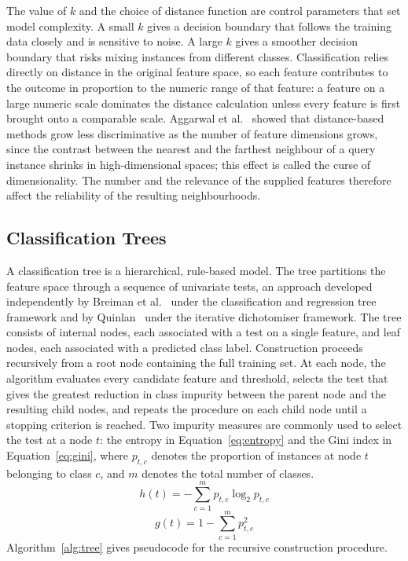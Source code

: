 \documentclass[10pt,conference]{IEEEtran}
\begin{document}
The value of $k$ and the choice of distance function are control parameters that set model complexity. A small $k$ gives a decision boundary that follows the training data closely and is sensitive to noise. A large $k$ gives a smoother decision boundary that risks mixing instances from different classes. Classification relies directly on distance in the original feature space, so each feature contributes to the outcome in proportion to the numeric range of that feature: a feature on a large numeric scale dominates the distance calculation unless every feature is first brought onto a comparable scale. Aggarwal et al.~\cite{aggarwal2001} showed that distance-based methods grow less discriminative as the number of feature dimensions grows, since the contrast between the nearest and the farthest neighbour of a query instance shrinks in high-dimensional spaces; this effect is called the curse of dimensionality. The number and the relevance of the supplied features therefore affect the reliability of the resulting neighbourhoods.

\subsection{Classification Trees}
\label{sec:background-tree}

A classification tree is a hierarchical, rule-based model. The tree partitions the feature space through a sequence of univariate tests, an approach developed independently by Breiman et al.~\cite{breiman1984} under the classification and regression tree framework and by Quinlan~\cite{quinlan1986} under the iterative dichotomiser framework. The tree consists of internal nodes, each associated with a test on a single feature, and leaf nodes, each associated with a predicted class label. Construction proceeds recursively from a root node containing the full training set. At each node, the algorithm evaluates every candidate feature and threshold, selects the test that gives the greatest reduction in class impurity between the parent node and the resulting child nodes, and repeats the procedure on each child node until a stopping criterion is reached. Two impurity measures are commonly used to select the test at a node $t$: the entropy in Equation~\eqref{eq:entropy} and the Gini index in Equation~\eqref{eq:gini}, where $p_{t,c}$ denotes the proportion of instances at node $t$ belonging to class $c$, and $m$ denotes the total number of classes.
\begin{equation}
\label{eq:entropy}
h(t) = -\sum_{c=1}^{m} p_{t,c} \log_2 p_{t,c}
\end{equation}
\begin{equation}
\label{eq:gini}
g(t) = 1 - \sum_{c=1}^{m} p_{t,c}^{2}
\end{equation}
Algorithm~\ref{alg:tree} gives pseudocode for the recursive construction procedure.
\end{document}
